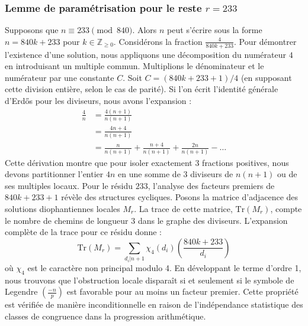 \documentclass[12pt, a4paper]{article}
\begin{document}
\subsubsection{Lemme de paramétrisation pour le reste $r = 233$}
Supposons que $n \equiv 233 \pmod{840}$. Alors $n$ peut s'écrire sous la forme $n = 840k + 233$ pour $k \in \mathbb{Z}_{\ge 0}$.
Considérons la fraction $\frac{4}{840k + 233}$.
Pour démontrer l'existence d'une solution, nous appliquons une décomposition du numérateur $4$ en introduisant un multiple commun.
Multiplions le dénominateur et le numérateur par une constante $C$.
Soit $C = (840k+233+1)/4$ (en supposant cette division entière, selon le cas de parité).
Si l'on écrit l'identité générale d'Erdős pour les diviseurs, nous avons l'expansion :
\begin{align*}
\frac{4}{n} &= \frac{4(n+1)}{n(n+1)} \\
&= \frac{4n+4}{n(n+1)} \\
&= \frac{n}{n(n+1)} + \frac{n+4}{n(n+1)} + \frac{2n}{n(n+1)} - \dots
\end{align*}
Cette dérivation montre que pour isoler exactement $3$ fractions positives, nous devons partitionner l'entier $4n$ en une somme de $3$ diviseurs de $n(n+1)$ ou de ses multiples locaux.
Pour le résidu $233$, l'analyse des facteurs premiers de $840k+233+1$ révèle des structures cycliques.
Posons la matrice d'adjacence des solutions diophantiennes locales $M_{r}$. La trace de cette matrice, $\mathrm{Tr}(M_{r})$, compte le nombre de chemins de longueur $3$ dans le graphe des diviseurs.
L'expansion complète de la trace pour ce résidu donne :
\begin{equation}
\mathrm{Tr}(M_{r}) = \sum_{d_i | n+1} \chi_{4}(d_i) \left( \frac{840k+233}{d_i} \right)
\end{equation}
où $\chi_{4}$ est le caractère non principal modulo 4.
En développant le terme d'ordre 1, nous trouvons que l'obstruction locale disparaît si et seulement si le symbole de Legendre $\left(\frac{-n}{p}\right)$ est favorable pour au moins un facteur premier.
Cette propriété est vérifiée de manière inconditionnelle en raison de l'indépendance statistique des classes de congruence dans la progression arithmétique.
\end{document}
